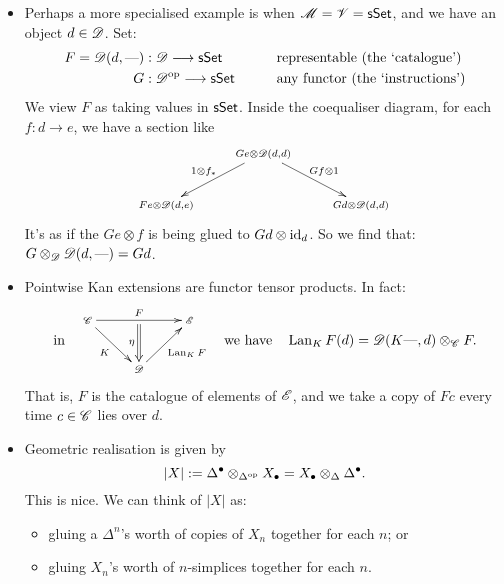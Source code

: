 \documentclass[11pt]{article}
\begin{document}
\begin{5. The unreasonably effective (co)bar construction}
\begin{itemise}
\begin{itemize}
\item Perhaps a more specialised example is when $\mathscr{M}=\mathscr{V}=\operatorname{{\mathsf{sSet}}}$, and we have an object $d\in\mathscr{D}$. Set:
\begin{alignat*}{2}
F=\scrD(d,\DASH )
&:
\scrD\to\sSet%
&\qquad&\text{representable (the `catalogue')}\\
G
&:
\scrD^{\op}\to\sSet%
&\qquad&\text{any functor (the `instructions')}
\end{alignat*}
We view $F$ as taking values in $\operatorname{{\mathsf{sSet}}}$.  Inside the coequaliser diagram, for each $f:d\to e$, we have a section like
\[
{
\def\objectstyle{\scriptstyle}
\xymatrix{
&%
Ge\otimes \scrD(d,d)
\ar[ld]_-{1\otimes f_*}
\ar[rd]^-{Gf\otimes 1}
&%
\\%
Fe\otimes \scrD(d,e)
&%
&%
Gd\otimes \scrD(d,d)%
}}\]
It's as if the $Ge\otimes f$ is being glued to $Gd\otimes \textup{id}_d$. So we find that:
$G\otimes_{\mathscr{D}}\mathscr{D}(d,\textup{---} )=Gd$.
\item Pointwise Kan extensions are functor tensor products. In fact:
\[\textup{in}\quad \vcenter{\xymatrix{
\scrC\ar[rd]_-{K}\ar[rr]^-{F}_-{}="arF"&%
&%
\scrE\\%
&%
\scrD\ar@{->}[ur]_{\Lan_KF}\ar@{=>}"arF";[]_-{\eta}&%
}}\textup{\quad we have\quad }\Lan_KF(d)=\scrD(K\DASH ,d)\otimes_\scrC F.\]
That is, $F$ is the catalogue of elements of $\mathscr{E}$, and we take a copy of $Fc$ every time $c\in\mathscr{C}$ lies over $d$.
\item Geometric realisation is given by
\[|X|:=\Delta^\bullet \otimes_{\Delta^{\textup{op}}}X_\bullet = X_\bullet\otimes_{\Delta} \Delta^\bullet.\]
This is nice. We can think of $|X|$ as:
\begin{itemize}\squishlist
\setlength{\parindent}{.25in}
\item gluing a $\Delta^n$'s worth of copies of $X_n$ together for each $n$; or
\item gluing $X_n$'s worth of $n$-simplices together for each $n$.
\end{itemize}
\end{itemize}
\end{itemise}

\end{5. The unreasonably effective (co)bar construction}
\end{document}
